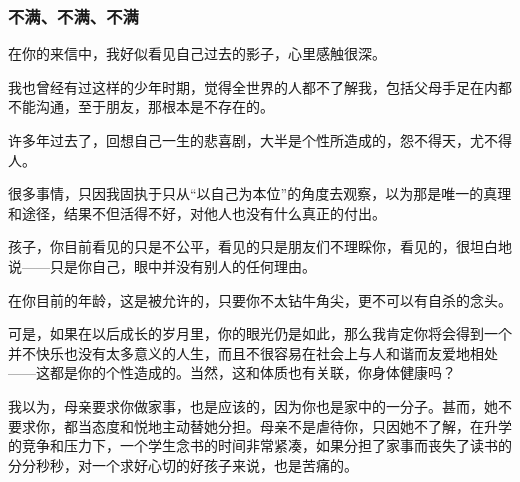 \subsubsection{不满、不满、不满}
\par {}
\par 在你的来信中，我好似看见自己过去的影子，心里感触很深。
\par 我也曾经有过这样的少年时期，觉得全世界的人都不了解我，包括父母手足在内都不能沟通，至于朋友，那根本是不存在的。
\par 许多年过去了，回想自己一生的悲喜剧，大半是个性所造成的，怨不得天，尤不得人。
\par 很多事情，只因我固执于只从“以自己为本位”的角度去观察，以为那是唯一的真理和途径，结果不但活得不好，对他人也没有什么真正的付出。
\par 孩子，你目前看见的只是不公平，看见的只是朋友们不理睬你，看见的，很坦白地说——只是你自己，眼中并没有别人的任何理由。
\par 在你目前的年龄，这是被允许的，只要你不太钻牛角尖，更不可以有自杀的念头。
\par 可是，如果在以后成长的岁月里，你的眼光仍是如此，那么我肯定你将会得到一个并不快乐也没有太多意义的人生，而且不很容易在社会上与人和谐而友爱地相处——这都是你的个性造成的。当然，这和体质也有关联，你身体健康吗？
\par 我以为，母亲要求你做家事，也是应该的，因为你也是家中的一分子。甚而，她不要求你，都当态度和悦地主动替她分担。母亲不是虐待你，只因她不了解，在升学的竞争和压力下，一个学生念书的时间非常紧凑，如果分担了家事而丧失了读书的分分秒秒，对一个求好心切的好孩子来说，也是苦痛的。
